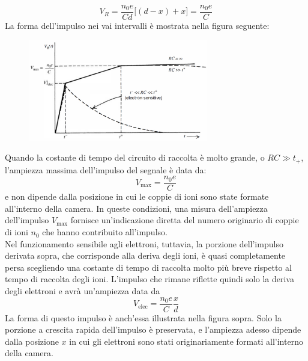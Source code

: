 \begin{approfondimento}
\begin{equation*}
      V_R=\frac{n_0 e}{Cd} \bigl[ (d - x) + x \bigr]
      =\frac{n_0 e}{C}
   \end{equation*}
   La forma dell'impulso nei vai intervalli è mostrata nella figura seguente:
   \begin{figure}[H]
      \centering
      \includegraphics[width=0.7\textwidth]{immagini/forma_segnale_rivelatore_a_gas.png}
   \end{figure}
   Quando la costante di tempo del circuito di raccolta è molto grande, o $RC \gg t_{+}$, l'ampiezza massima dell'impulso del segnale è data da:
   \begin{equation*}
      V_{\text{max}}=\frac{n_0 e}{C}
   \end{equation*}
   e non dipende dalla posizione in cui le coppie di ioni sono state formate all'interno della camera. In queste condizioni, una misura dell'ampiezza dell'impulso $ V_{\text{max}} $ fornisce un'indicazione diretta del numero originario di coppie di ioni $n_0$ che hanno contribuito all'impulso.\\
   Nel funzionamento sensibile agli elettroni, tuttavia, la porzione dell'impulso derivata sopra, che corrisponde alla deriva degli ioni, è quasi completamente persa scegliendo una costante di tempo di raccolta molto più breve rispetto al tempo di raccolta degli ioni. L'impulso che rimane riflette quindi solo la deriva degli elettroni e avrà un'ampiezza data da
   \begin{equation*}
      V_{\text{elec}}=\frac{n_0 e}{C} \frac{x}{d}
   \end{equation*}
   La forma di questo impulso è anch'essa illustrata nella figura sopra. Solo la porzione a crescita rapida dell'impulso è preservata, e l'ampiezza adesso dipende dalla posizione $x$ in cui gli elettroni sono stati originariamente formati all'interno della camera.
\end{approfondimento}

